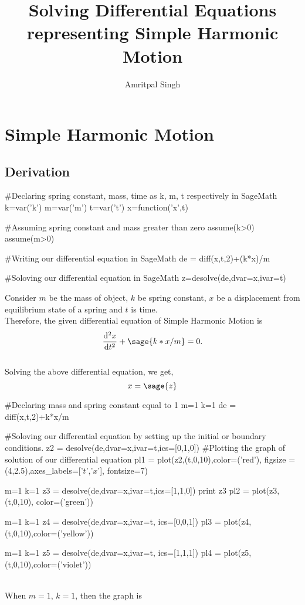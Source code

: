\documentclass{report}
\title{Solving Differential Equations representing Simple Harmonic Motion}
\author{Amritpal Singh}
\begin{document}
\begin{titlepage}
\maketitle
\tableofcontents
\end{titlepage}


\chapter{Simple Harmonic Motion}
\section{Derivation}
\begin{sagesilent}
#Declaring spring constant, mass, time as k, m, t respectively in SageMath
k=var('k')
m=var('m')
t=var('t')
x=function('x',t)

#Assuming spring constant and mass greater than zero
assume(k>0)
assume(m>0)

#Writing our differential equation in SageMath
de = diff(x,t,2)+(k*x)/m

#Soloving our differential equation in SageMath
z=desolve(de,dvar=x,ivar=t)
\end{sagesilent}

Consider $m$ be the mass of object, $k$ be spring constant, $x$ be a displacement from equilibrium state of a spring and $t$ is time.\\
Therefore, the given differential equation of Simple Harmonic Motion is  
\[
  \frac{\mathrm{d}^{2}x}{\mathrm{d}t^{2}} +  \sage{k*x/m} = 0.
\]\\
Solving the above differential equation, we get,
$$x = \sage{z}$$
\begin{sagesilent}
#Declaring mass and spring constant equal to 1
m=1
k=1
de = diff(x,t,2)+k*x/m

#Soloving our differential equation by setting up the initial or boundary conditions.
z2 = desolve(de,dvar=x,ivar=t,ics=[0,1,0])
#Plotting the graph of solution of our differential equation
pl1 = plot(z2,(t,0,10),color=('red'), figsize = (4,2.5),axes_labels=['$t$','$x$'], fontsize=7)

m=1
k=1
z3 = desolve(de,dvar=x,ivar=t,ics=[1,1,0])
print z3
pl2 = plot(z3,(t,0,10), color=('green'))

m=1
k=1
z4 = desolve(de,dvar=x,ivar=t, ics=[0,0,1])
pl3 = plot(z4,(t,0,10),color=('yellow'))

m=1
k=1
z5 = desolve(de,dvar=x,ivar=t, ics=[1,1,1])
pl4 = plot(z5,(t,0,10),color=('violet'))
\end{sagesilent}\\
When $m=1$, $k=1$, then the graph is
\end{document}
